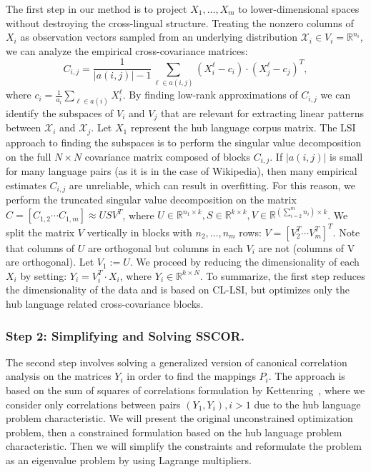\documentclass[twoside,11pt]{article}
\newcommand{\RR}{\mathbb{R}}
\begin{document}
The first step in our method is to project $X_1, \ldots, X_m$ to lower-dimensional spaces without destroying the cross-lingual structure. Treating the nonzero columns of $X_i$ as observation vectors sampled from an underlying distribution $\mathcal{X}_i \in V_i = \RR^{n_i}$, we can analyze the empirical cross-covariance matrices:
$$C_{i,j} = \frac{1}{|a(i,j)|-1 }\sum_{\ell \in a(i,j)} (X_i^{\ell} - c_i)\cdot (X_j^{\ell} - c_j)^T,$$
 where $c_i = \frac{1}{a_i} \sum_{\ell \in a(i)}X_i^{\ell}$. By finding low-rank approximations of $C_{i,j}$ we can identify the subspaces of $V_i$ and $V_j$ that are relevant for extracting linear patterns between $\mathcal{X}_i$ and $\mathcal{X}_j$. Let $X_1$ represent the hub language corpus matrix. The LSI approach to finding the subspaces is to perform the singular value decomposition on the full $N \times N$ covariance matrix composed of blocks $C_{i,j}$. If $|a(i,j)|$ is small for many language pairs (as it is in the case of Wikipedia), then many empirical estimates $C_{i,j}$ are unreliable, which can result in overfitting. For this reason, we perform the truncated singular value decomposition on the matrix $C = [C_{1,2}  \cdots  C_{1,m}] \approx U S V^T$, where $U \in \RR^{n_1 \times k}, S \in \RR^{k \times k}, V \in \RR^{(\sum_{i=2}^m n_i) \times k}$. We split the matrix $V$ vertically in blocks with $n_2, \ldots, n_m$ rows: $V = [V_2^T  \cdots  V_m^T]^T$. Note that columns of $U$ are orthogonal but columns in each $V_i$ are not (columns of V are orthogonal). Let $V_1 := U$. We proceed by reducing the dimensionality of each $X_i$ by setting: $Y_i = V_i^T \cdot X_i$, where $Y_i \in \RR^{k\times N}$. To summarize, the first step reduces the dimensionality of the data and is based on CL-LSI, but optimizes only the hub language related cross-covariance blocks.

\subsubsection{Step 2: Simplifying and Solving SSCOR.}
The second step involves solving a generalized version of canonical correlation analysis on the matrices $Y_i$ in order to find the mappings $P_i$. The approach is based on the sum of squares of correlations formulation by Kettenring~\cite{Kettenring}, where we consider only correlations between pairs $(Y_1, Y_i), i >1$ due to the hub language problem characteristic.
We will present the original unconstrained optimization problem, then a constrained formulation based on the hub language problem characteristic. Then we will simplify the constraints and reformulate the problem as an eigenvalue problem by using Lagrange multipliers.
\end{document}
